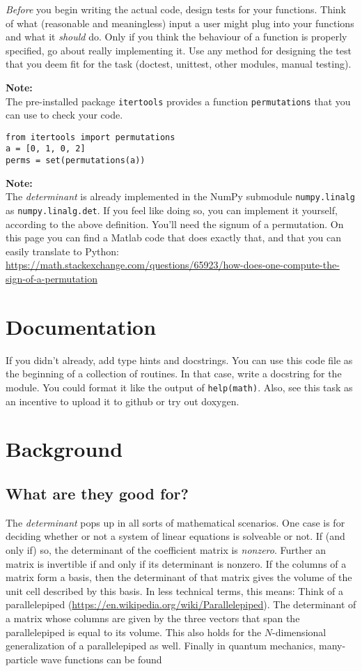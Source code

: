 \documentclass[
	english,
	fontsize=10pt,
	parskip=half,
	titlepage=true,
	DIV=12
]{scrartcl}
\begin{document}
\emph{Before} you begin writing the actual code, design tests for your functions. Think of what (reasonable and meaningless) input a user might plug into your functions and what it \emph{should} do. Only if you think the behaviour of a function is properly specified, go about really implementing it. Use any method for designing the test that you deem fit for the task (doctest, unittest, other modules, manual testing).

\textbf{Note:}\\
The pre-installed package \texttt{itertools} provides a function \texttt{permutations} that you can use to check your code.
\begin{verbatim}
from itertools import permutations
a = [0, 1, 0, 2]
perms = set(permutations(a))
\end{verbatim}

\textbf{Note:}\\
The \emph{determinant} is already implemented in the NumPy submodule \texttt{numpy.linalg} as \texttt{numpy.linalg.det}. If you feel like doing so, you can implement it yourself, according to the above definition. You'll need the signum of a permutation. On this page you can find a Matlab code that does exactly that, and that you can easily translate to Python:
\url{https://math.stackexchange.com/questions/65923/how-does-one-compute-the-sign-of-a-permutation}

\section{Documentation}
If you didn't already, add type hints and docstrings. You can use this code file as the beginning of a collection of routines. In that case, write a docstring for the module. You could format it like the output of \texttt{help(math)}. Also, see this task as an incentive to upload it to github or try out doxygen.

\section{Background}
\subsection{What are they good for?}
The \emph{determinant} pops up in all sorts of mathematical scenarios. One case is for deciding whether or not a system of linear equations is solveable or not. If (and only if) so, the determinant of the coefficient matrix is \emph{nonzero}. Further an matrix is invertible if and only if its determinant is nonzero. If the columns of a matrix form a basis, then the determinant of that matrix gives the volume of the unit cell described by this basis. In less technical terms, this means: Think of a parallelepiped (\url{https://en.wikipedia.org/wiki/Parallelepiped}). The determinant of a matrix whose columns are given by the three vectors that span the parallelepiped is equal to its volume. This also holds for the $N$-dimensional generalization of a parallelepiped as well. Finally in quantum mechanics, many-particle wave functions can be found
\end{document}
